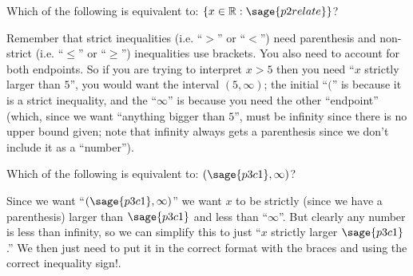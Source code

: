 \documentclass{ximera}
\begin{document}
\begin{problem}
    Which of the following is equivalent to: $\{ x \in \mathbb{R} : \sage{p2relate} \}$?
    \begin{multipleChoice}
    \end{multipleChoice}
    
    \begin{feedback}
        Remember that strict inequalities (i.e. ``$>$'' or ``$<$'') need parenthesis and non-strict (i.e. ``$\leq$'' or ``$\geq$'') inequalities use brackets. You also need to account for both endpoints. So if you are trying to interpret $x > 5$ then you need ``$x$ strictly larger than $5$'', you would want the interval $(5,\infty)$; the initial ``$($'' is because it is a strict inequality, and the ``$\infty$'' is because you need the other ``endpoint'' (which, since we want ``anything bigger than $5$'', must be infinity since there is no upper bound given; note that infinity always gets a parenthesis since we don't include it as a ``number'').
    \end{feedback}
\end{problem}


\begin{problem}
    Which of the following is equivalent to: $(\sage{p3c1}, \infty)$?
    \begin{multipleChoice}
    \end{multipleChoice}
    
    \begin{feedback}
        Since we want ``$(\sage{p3c1}, \infty)$'' we want $x$ to be strictly (since we have a parenthesis) larger than $\sage{p3c1}$ and less than ``$\infty$''. But clearly any number is less than infinity, so we can simplify this to just ``$x$ strictly larger $\sage{p3c1}$.'' We then just need to put it in the correct format with the braces and using the correct inequality sign!. 
    \end{feedback}
\end{problem}
\end{document}
